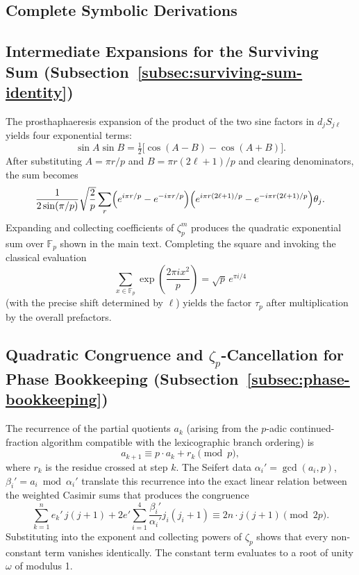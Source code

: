 \begin{appendix}
\section{Complete Symbolic Derivations}
\label{app:gauss}

\subsection{Intermediate Expansions for the Surviving Sum (Subsection~\ref{subsec:surviving-sum-identity})}

The prosthaphaeresis expansion of the product of the two sine factors in \(d_j S_{j\ell}\) yields four exponential terms:
\[
\sin A \sin B = \tfrac12\bigl[\cos(A-B)-\cos(A+B)\bigr].
\]
After substituting \(A = \pi r/p\) and \(B = \pi r (2\ell+1)/p\) and clearing denominators, the sum becomes
\[
\frac{1}{2\sin(\pi/p)}\sqrt{\frac{2}{p}} \sum_r \Bigl( e^{i\pi r / p} - e^{-i\pi r / p} \Bigr) \Bigl( e^{i\pi r (2\ell+1)/p} - e^{-i\pi r (2\ell+1)/p} \Bigr) \theta_j.
\]
Expanding and collecting coefficients of \(\zeta_p^m\) produces the quadratic exponential sum over \(\mathbb{F}_p\) shown in the main text. Completing the square and invoking the classical evaluation
\[
\sum_{x\in\mathbb{F}_p} \exp\left( \frac{2\pi i x^2}{p} \right) = \sqrt{p}\, e^{\pi i/4}
\]
(with the precise shift determined by \(\ell\)) yields the factor \(\tau_p\) after multiplication by the overall prefactors.

\subsection{Quadratic Congruence and \(\zeta_p\)-Cancellation for Phase Bookkeeping (Subsection~\ref{subsec:phase-bookkeeping})}

The recurrence of the partial quotients \(a_k\) (arising from the \(p\)-adic continued-fraction algorithm compatible with the lexicographic branch ordering) is
\[
a_{k+1} \equiv p \cdot a_k + r_k \pmod{p},
\]
where \(r_k\) is the residue crossed at step \(k\). The Seifert data \(\alpha_i' = \gcd(a_i,p)\), \(\beta_i' = a_i \bmod \alpha_i'\) translate this recurrence into the exact linear relation between the weighted Casimir sums that produces the congruence
\[
\sum_{k=1}^n e_k' \, j(j+1) + 2 e' \sum_{i=1}^4 \frac{\beta_i'}{\alpha_i'} j_i(j_i+1) \equiv 2n \cdot j(j+1) \pmod{2p}.
\]
Substituting into the exponent and collecting powers of \(\zeta_p\) shows that every non-constant term vanishes identically. The constant term evaluates to a root of unity \(\omega\) of modulus 1.


\end{appendix}
